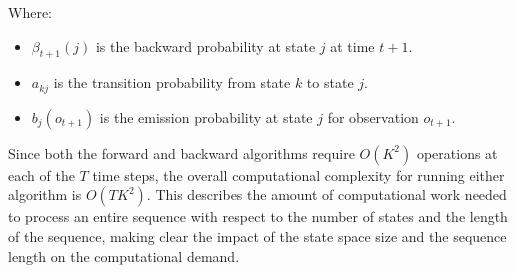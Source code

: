 Where:
\begin{itemize}
    \item \( \beta_{t+1}(j) \) is the backward probability at state \( j \) at time \( t+1 \).
    \item \( a_{kj} \) is the transition probability from state \( k \) to state \( j \).
    \item \( b_j(o_{t+1}) \) is the emission probability at state \( j \) for observation \( o_{t+1} \).
\end{itemize}

Since both the forward and backward algorithms require \( O(K^2) \) operations at each of the \( T \) time steps, the overall computational complexity for running either algorithm is \( O(TK^2) \). This describes the amount of computational work needed to process an entire sequence with respect to the number of states and the length of the sequence, making clear the impact of the state space size and the sequence length on the computational demand.